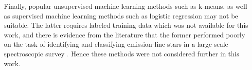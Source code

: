 Finally, popular unsupervised machine learning methods such as k-means, as well as supervised machine learning methods such as logistic regression may not be suitable. The latter requires labeled training data which was not available for this work, and there is evidence from the literature that the former performed poorly on the task of identifying and classifying emission-line stars in a large scale spectroscopic survey \citep{garcia2018machine}. Hence these methods were not considered further in this work.

